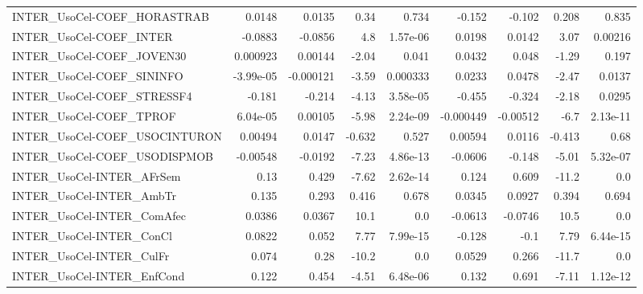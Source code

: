 \begin{tabular}{lrrrrrrrr}
INTER\_UsoCel-COEF\_HORASTRAB            &      0.0148 &       0.0135 &     0.34 &    0.734 &     -0.152 &      -0.102 &        0.208 &         0.835 \\
INTER\_UsoCel-COEF\_INTER                &     -0.0883 &      -0.0856 &      4.8 & 1.57e-06 &     0.0198 &      0.0142 &         3.07 &       0.00216 \\
INTER\_UsoCel-COEF\_JOVEN30              &    0.000923 &      0.00144 &    -2.04 &    0.041 &     0.0432 &       0.048 &        -1.29 &         0.197 \\
INTER\_UsoCel-COEF\_SININFO              &   -3.99e-05 &    -0.000121 &    -3.59 & 0.000333 &     0.0233 &      0.0478 &        -2.47 &        0.0137 \\
INTER\_UsoCel-COEF\_STRESSF4             &      -0.181 &       -0.214 &    -4.13 & 3.58e-05 &     -0.455 &      -0.324 &        -2.18 &        0.0295 \\
INTER\_UsoCel-COEF\_TPROF                &    6.04e-05 &      0.00105 &    -5.98 & 2.24e-09 &  -0.000449 &    -0.00512 &         -6.7 &      2.13e-11 \\
INTER\_UsoCel-COEF\_USOCINTURON          &     0.00494 &       0.0147 &   -0.632 &    0.527 &    0.00594 &      0.0116 &       -0.413 &          0.68 \\
INTER\_UsoCel-COEF\_USODISPMOB           &    -0.00548 &      -0.0192 &    -7.23 & 4.86e-13 &    -0.0606 &      -0.148 &        -5.01 &      5.32e-07 \\
INTER\_UsoCel-INTER\_AFrSem              &        0.13 &        0.429 &    -7.62 & 2.62e-14 &      0.124 &       0.609 &        -11.2 &           0.0 \\
INTER\_UsoCel-INTER\_AmbTr               &       0.135 &        0.293 &    0.416 &    0.678 &     0.0345 &      0.0927 &        0.394 &         0.694 \\
INTER\_UsoCel-INTER\_ComAfec             &      0.0386 &       0.0367 &     10.1 &      0.0 &    -0.0613 &     -0.0746 &         10.5 &           0.0 \\
INTER\_UsoCel-INTER\_ConCl               &      0.0822 &        0.052 &     7.77 & 7.99e-15 &     -0.128 &        -0.1 &         7.79 &      6.44e-15 \\
INTER\_UsoCel-INTER\_CulFr               &       0.074 &         0.28 &    -10.2 &      0.0 &     0.0529 &       0.266 &        -11.7 &           0.0 \\
INTER\_UsoCel-INTER\_EnfCond             &       0.122 &        0.454 &    -4.51 & 6.48e-06 &      0.132 &       0.691 &        -7.11 &      1.12e-12 \\

\end{tabular}
